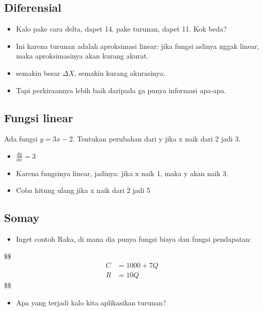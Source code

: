 \documentclass[
  letterpaper,
  DIV=11,
  numbers=noendperiod]{scrartcl}
\providecommand{\tightlist}{%
  \setlength{\itemsep}{0pt}\setlength{\parskip}{0pt}}\usepackage{longtable,booktabs,array}
\begin{document}
\subsection{Diferensial}\label{diferensial-1}

\begin{itemize}
\item
  Kalo pake cara delta, dapet 14. pake turunan, dapet 11. Kok beda?
\item
  Ini karena turunan adalah aproksimasi linear: jika fungsi aslinya
  nggak linear, maka aproksimasinya akan kurang akurat.
\item
  semakin besar \(\Delta X\), semakin kurang akurasinya.
\item
  Tapi perkiraannya lebih baik daripada ga punya informasi apa-apa.
\end{itemize}

\subsection{Fungsi linear}\label{fungsi-linear-4}

Ada fungsi \(y=3x-2\). Tentukan perubahan dari y jika x naik dari 2 jadi
3.

\begin{itemize}
\item
  \(\frac{dy}{dx}=3\)
\item
  Karena fungsinya linear, jadinya: jika x naik 1, maka y akan naik 3.
\item
  Coba hitung ulang jika x naik dari 2 jadi 5
\end{itemize}

\subsection{Somay}\label{somay}

\begin{itemize}
\tightlist
\item
  Inget contoh Raka, di mana dia punya fungsi biaya dan fungsi
  pendapatan:
\end{itemize}

\$\$ \begin{align}
C&=1000+7Q \\

R&=10Q

\end{align} \$\$

\begin{itemize}
\tightlist
\item
  Apa yang terjadi kalo kita aplikasikan turunan?
\end{itemize}
\end{document}

